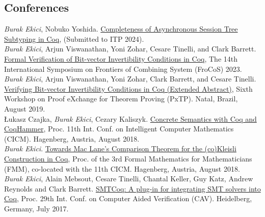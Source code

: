 \documentclass[10pt, a4paper]{article}
\newcommand{\years}[1]{\marginnote{\scriptsize #1}}
\begin{document}
\subsection*{Conferences}
 \years{\normalsize2024}
\emph{Burak Ekici}, Nobuko Yoshida.
{\href{https://github.com/ekiciburak/sessionTreeST/tree/localtype}{Completeness of Asynchronous Session Tree Subtyping in Coq}}, (Submitted to ITP 2024).
 \\[0.20cm]
\years{\normalsize2023}
\emph{Burak Ekici}, Arjun Viswanathan, Yoni Zohar, Cesare
Tinelli, and Clark Barrett.
{\href{https://link.springer.com/chapter/10.1007/978-3-031-43369-6_3}{Formal Verification of Bit-vector Invertibility Conditions in Coq}}, 
The 14th International Symposium on Frontiers of Combining System (FroCoS) 2023.
 \\[0.20cm]
\years{\normalsize2019}
\emph{Burak Ekici}, Arjun Viswanathan, Yoni Zohar, Clark Barrett, and Cesare
Tinelli.
{\href{http://pxtp.gforge.inria.fr/2019/papers/PxTP_2019_paper_5.pdf}{Verifying Bit-vector Invertibility Conditions in Coq (Extended Abstract)}}, 
Sixth Workshop on Proof eXchange for Theorem Proving (PxTP). Natal, Brazil, August 2019.
 \\[0.20cm]
\years{\normalsize2018}
\L ukasz Czajka, \emph{Burak Ekici}, Cezary Kaliszyk.
{\href{https://www.mimuw.edu.pl/~lukaszcz/cicm2018.pdf}{Concrete Semantics with Coq and CoqHammer}}, 
Proc. 11th Int. Conf. on Intelligent Computer Mathematics (CICM). Hagenberg, Austria, August 2018.
 \\[0.20cm]
\years{\normalsize2018}
\emph{Burak Ekici}.
{\href{https://www.cicm-conference.org/2018/infproc/paper11.pdf}{Towards Mac Lane's Comparison Theorem for the (co)Kleisli Construction in Coq}},
Proc. of the 3rd Formal Mathematics for Mathematicians (FMM), co-located with the 11th CICM. Hagenberg, Austria, August 2018.
 \\[0.20cm]
\years{\normalsize2017}
\emph{Burak Ekici}, Alain Mebsout, Cesare Tinelli,
Chantal Keller, Guy Katz, Andrew Reynolds and Clark Barrett. 
{\href{http://homepage.divms.uiowa.edu/~tinelli/papers/EkiEtAl-CAV-17.pdf}{SMTCoq: A plug-in for integrating SMT solvers into Coq}}, 
Proc. 29th Int. Conf. on Computer Aided Verification (CAV). Heidelberg, Germany, July 2017.
 \\[0.20cm]
\years{\normalsize2016}
\end{document}
